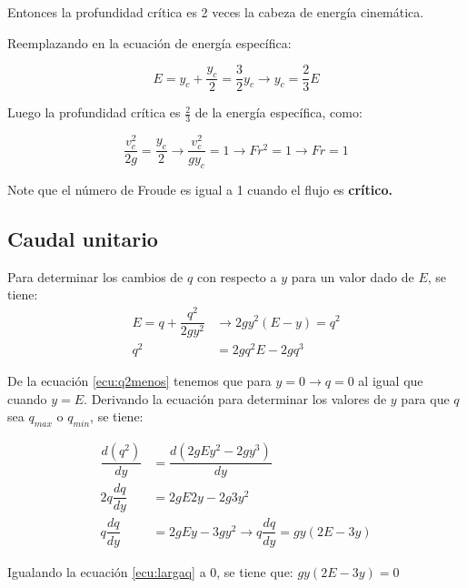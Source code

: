 \documentclass[a4paper, 11pt]{article}
\begin{document}
Entonces la profundidad crítica es 2 veces la cabeza de energía cinemática.

Reemplazando en la ecuación de energía específica:

\begin{equation}
    E=y_{c}+\dfrac{y_{c}}{2}=\dfrac{3}{2}y_{c}\rightarrow y_{c}=\dfrac{2}{3}E
\end{equation}

Luego la profundidad crítica es $\frac{2}{3}$ de la energía específica, como:

\begin{equation}
    \dfrac{v_c^{2}}{2g}=\dfrac{y_{c}}{2}\rightarrow\dfrac{v_c^{2}}{gy_{c}}=1 \rightarrow Fr^{2}=1 \rightarrow Fr=1
\end{equation}

Note que el número de Froude es igual a 1 cuando el flujo es \textbf{crítico.}

\subsection{Caudal unitario}

Para determinar los cambios de $q$ con respecto a $y$ para un valor dado de $E$, se tiene:
\begin{equation}
    \begin{aligned}
      E=q+\dfrac{q^{2}}{2gy^{2}}&\rightarrow2gy^{2}(E-y)=q^{2} \\
      q^{2}&=2gq^{2}E-2gq^{3}
    \end{aligned}
    \label{ecu:q2menos}
\end{equation}
 
De la ecuación \ref{ecu:q2menos} tenemos que para $y=0\rightarrow q=0$ al igual que cuando $y=E$. Derivando la ecuación para determinar los valores de $y$ para que $q$ sea $q_{max}$ o $q_{min}$, se tiene:

\begin{equation}
    \begin{aligned}
        \dfrac{d(q^{2})}{dy}&=\dfrac{d(2gEy^{2}-2gy^{3})}{dy} \\
        2q \dfrac{dq}{dy}&=2gE2y-2g3y^{2}\\
        q \dfrac{dq}{dy}&=2gEy-3gy^{2} \rightarrow q \dfrac{dq}{dy}=gy(2E-3y)
    \end{aligned}
    \label{ecu:largaq}
\end{equation}

Igualando la ecuación \ref{ecu:largaq} a 0, se tiene que: $gy(2E-3y)=0$
\end{document}
